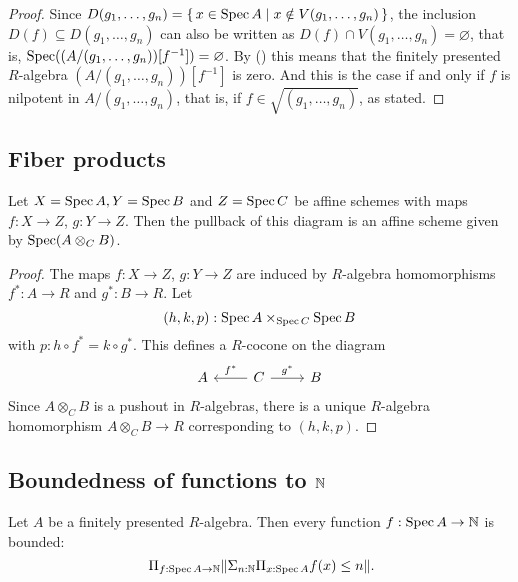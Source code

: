 \begin{proof}
  Since $D(g_1, \dots, g_n) = \{\, x \in \operatorname{Spec} A \mid x \notin V(g_1, \dots, g_n) \,\}$,
  the inclusion $D(f) \subseteq D(g_1, \dots, g_n)$
  can also be written as
  $D(f) \cap V(g_1, \dots, g_n) = \varnothing$, that is,
  $\operatorname{Spec}((A/(g_1, \dots, g_n))[f^{-1}]) = \varnothing$.
  By ()
  this means that the finitely presented $R$-algebra $(A/(g_1, \dots, g_n))[f^{-1}]$
  is zero.
  And this is the case if and only if $f$ is nilpotent in $A/(g_1, \dots, g_n)$,
  that is, if $f \in \sqrt{(g_1, \dots, g_n)}$, as stated.
\end{proof}

\subsection{Fiber products}

\begin{lemma}%
  \label{affine-fiber-product}
  Let $X=\operatorname{Spec} A,Y=\operatorname{Spec} B$ and $Z=\operatorname{Spec} C$ be affine schemes
  with maps $f:X\to Z$, $g:Y\to Z$.
  Then the pullback of this diagram is an affine scheme given by $\operatorname{Spec} (A\otimes_C B)$.
\end{lemma}

\begin{proof}
  The maps $f:X\to Z$, $g:Y\to Z$ are induced by $R$-algebra homomorphisms $f^*:A\to R$ and $g^*:B\to R$.
  Let
  \[ (h,k,p) : \operatorname{Spec} A \times_{\operatorname{Spec} C} \operatorname{Spec} B \]
  with $p:h\circ f^*=k\circ g^* $.
  This defines a $R$-cocone on the diagram
  \[
    \begin{tikzcd}
      A & C\ar[r,"g^*"]\ar[l,"f^*",swap] & B
    \end{tikzcd}
  \]
  Since $A\otimes_C B$ is a pushout in $R$-algebras,
  there is a unique $R$-algebra homomorphism $A\otimes_C B \to R$ corresponding to $(h,k,p)$.
\end{proof}

\subsection{Boundedness of functions to $\mathbb{N}$}

\begin{theorem}%
  \label{boundedness}
  Let $A$ be a finitely presented $R$-algebra.
  Then every function $f : \operatorname{Spec} A \to \mathbb{N}$ is bounded:
  \[ \Pi_{f : \Spec A \to \N} \propTrunc{\Sigma_{n : \N} \Pi_{x : \Spec A} f(x) \le n}
     \rlap{.} \]
\end{theorem}

